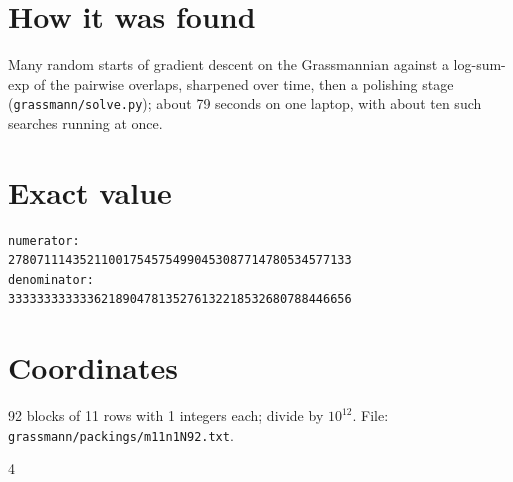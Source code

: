 \documentclass[11pt,a4paper]{article}
\begin{document}
\section{How it was found}
Many random starts of gradient descent on the Grassmannian against a log-sum-exp of the pairwise overlaps, sharpened over time, then a polishing stage (\texttt{grassmann/solve.py}); about 79 seconds on one laptop, with about ten such searches running at once.


\appendix
\section{Exact value}
{\small
\begin{verbatim}
numerator:
278071114352110017545754990453087714780534577133
denominator:
333333333333621890478135276132218532680788446656
\end{verbatim}}

\section{Coordinates}
92 blocks of 11 rows with 1 integers each; divide by $10^{12}$. File: \texttt{grassmann/packings/m11n1N92.txt}.
{\tiny
\begin{multicols}{4}
\end{multicols}}
\end{document}

